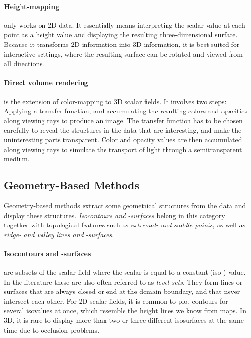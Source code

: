 %
\paragraph{Height-mapping} only works on \ac{2D} data.
%
It essentially means interpreting the scalar value at each point as a height
value and displaying the resulting three-dimensional surface.
%
Because it transforms \ac{2D} information into \ac{3D} information, it is best
suited for interactive settings, where the resulting surface can be rotated and
viewed from all directions.
%

%
\paragraph{Direct volume rendering} is the extension of color-mapping to \ac{3D}
scalar fields.
%
It involves two steps: Applying a transfer function, and accumulating the
resulting colors and opacities along viewing rays to produce an image.
%
The transfer function has to be chosen carefully to reveal the structures in the
data that are interesting, and make the uninteresting parts transparent.
%
Color and opacity values are then accumulated along viewing rays to simulate the
transport of light through a semitransparent medium.
%

\subsection{Geometry-Based Methods} %
\label{sub:geometry_based_methods}
%
Geometry-based methods extract some geometrical structures from the data and
display these structures.
%
\emph{Isocontours and -surfaces} belong in this category together with
topological features such as \emph{extremal- and saddle points}, as well as
\emph{ridge- and valley lines and -surfaces}.
%

%
\paragraph{Isocontours and -surfaces} are subsets of the scalar field where the
scalar is equal to a constant (iso-) value.
%
In the literature these are also often referred to as \emph{level sets}.
%
They form lines or surfaces that are always closed or end at the domain
boundary, and that never intersect each other.
%
For \ac{2D} scalar fields, it is common to plot contours for several isovalues
at once, which resemble the height lines we know from maps.
%
In \ac{3D}, it is rare to display more than two or three different isosurfaces
at the same time due to occlusion problems.
%

